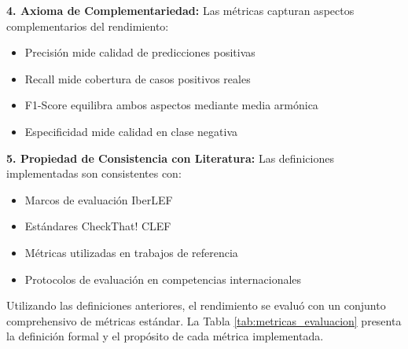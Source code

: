 \textbf{4. Axioma de Complementariedad:}
Las métricas capturan aspectos complementarios del rendimiento:
\begin{itemize}
    \item Precisión mide calidad de predicciones positivas
    \item Recall mide cobertura de casos positivos reales
    \item F1-Score equilibra ambos aspectos mediante media armónica
    \item Especificidad mide calidad en clase negativa
\end{itemize}

\textbf{5. Propiedad de Consistencia con Literatura:}
Las definiciones implementadas son consistentes con:
\begin{itemize}
    \item Marcos de evaluación IberLEF \cite{aragon2020overview}
    \item Estándares CheckThat! CLEF \cite{barron2023clef}
    \item Métricas utilizadas en trabajos de referencia \cite{posadas2019detection, blanco2024enhancing}
    \item Protocolos de evaluación en competencias internacionales
\end{itemize}

Utilizando las definiciones anteriores, el rendimiento se evaluó con un conjunto comprehensivo de métricas estándar. La Tabla \ref{tab:metricas_evaluacion} presenta la definición formal y el propósito de cada métrica implementada.

